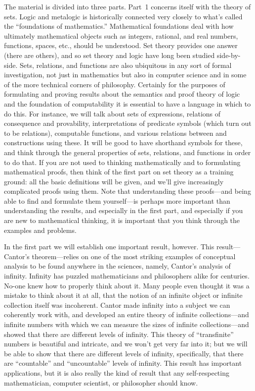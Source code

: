 The material is divided into three parts. Part~1 concerns
itself with the theory of sets. Logic and metalogic is historically
connected very closely to what's called the ``foundations of
mathematics.''  Mathematical foundations deal with how ultimately
mathematical objects such as integers, rational, and real numbers,
functions, spaces, etc., should be understood. Set theory provides
one answer (there are others), and so set theory and logic have long
been studied side-by-side. Sets, relations, and functions are also
ubiquitous in any sort of formal investigation, not just in
mathematics but also in computer science and in some of the more
technical corners of philosophy. Certainly for the purposes of
formulating and proving results about the semantics and proof theory
of logic and the foundation of computability it is essential to have a
language in which to do this. For instance, we will talk about sets
of expressions, relations of consequence and provability,
interpretations of predicate symbols (which turn out to be relations),
computable functions, and various relations between and constructions
using these. It will be good to have shorthand symbols for
these, and think through the general properties of sets, relations,
and functions in order to do that. If you are not used to thinking
mathematically and to formulating mathematical proofs, then think of
the first part on set theory as a training ground: all the basic
definitions will be given, and we'll give increasingly complicated
proofs using them. Note that understanding these proofs---and being
able to find and formulate them yourself---is perhaps more important
than understanding the results, and especially in the first part, and
especially if you are new to mathematical thinking, it is important
that you think through the examples and problems.

In the first part we will establish one important result, however.
This result---Cantor's theorem---relies on one of the most striking
examples of conceptual analysis to be found anywhere in the sciences,
namely, Cantor's analysis of infinity. Infinity has puzzled
mathematicians and philosophers alike for centuries. No-one knew how
to properly think about it. Many people even thought it was a mistake
to think about it at all, that the notion of an infinite object or
infinite collection itself was incoherent. Cantor made infinity into
a subject we can coherently work with, and developed an entire theory
of infinite collections---and infinite numbers with which we can
measure the sizes of infinite collections---and showed that there are
different levels of infinity. This theory of ``transfinite'' numbers
is beautiful and intricate, and we won't get very far into it; but we
will be able to show that there are different levels of infinity,
specifically, that there are ``countable'' and ``uncountable'' levels
of infinity. This result has important applications, but it is
also really the kind of result that any self-respecting mathematician,
computer scientist, or philosopher should know.

